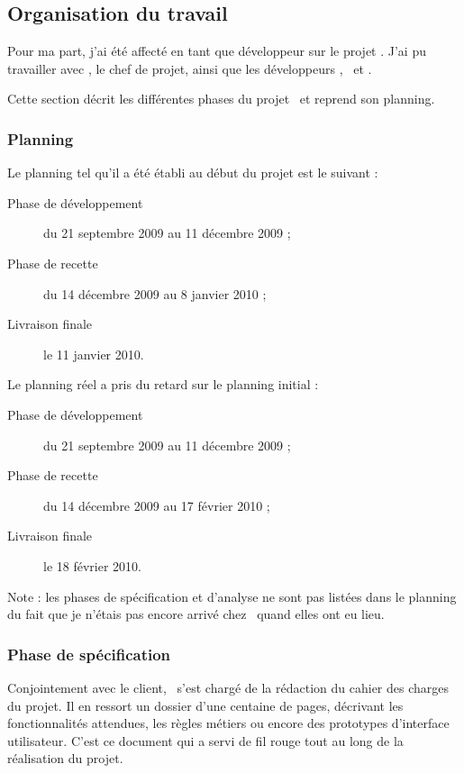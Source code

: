 \subsection{Organisation du travail}
\label{section:eyrolles_organisation}

Pour ma part, j'ai été affecté en tant que développeur sur le projet \aey. J'ai pu travailler avec \acohen, le chef de projet, ainsi que les développeurs \ahamon, \aweistroff\ et \abachelet. 

Cette section décrit les différentes phases du projet \aey\ et reprend son planning.


\subsubsection{Planning}

Le planning tel qu'il a été établi au début du projet est le suivant :

\begin{description}
	\item[Phase de développement] du 21 septembre 2009 au 11 décembre 2009 ;
	\item[Phase de recette] du 14 décembre 2009 au 8 janvier 2010 ;
	\item[Livraison finale] le 11 janvier 2010.
\end{description}

Le planning réel a pris du retard sur le planning initial :

\begin{description}
	\item[Phase de développement] du 21 septembre 2009 au 11 décembre 2009 ;
	\item[Phase de recette] du 14 décembre 2009 au 17 février 2010 ;
	\item[Livraison finale] le 18 février 2010.
\end{description}

Note : les phases de spécification et d'analyse ne sont pas listées dans le planning du fait que je n'étais pas encore arrivé chez \asl\ quand elles ont eu lieu.


\subsubsection{Phase de spécification}

Conjointement avec le client, \acohen\ s'est chargé de la rédaction du cahier des charges du projet. Il en ressort un dossier d'une centaine de pages, décrivant les fonctionnalités attendues, les règles métiers ou encore des prototypes d'interface utilisateur. C'est ce document qui a servi de fil rouge tout au long de la réalisation du projet.


